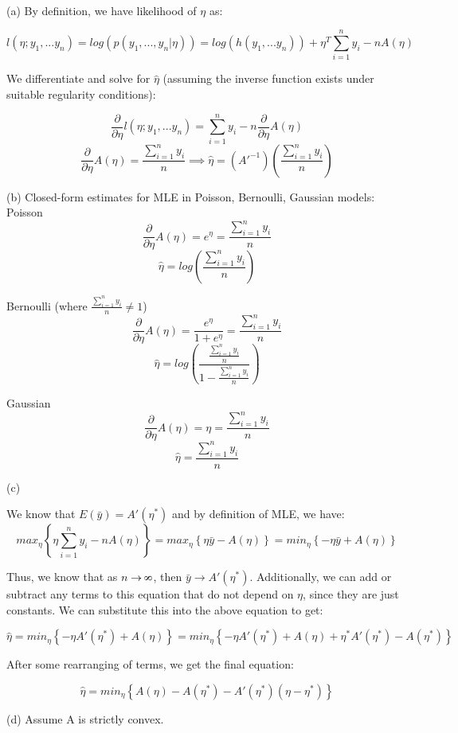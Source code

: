 \documentclass[11pt]{article}
\def\infinity{\rotatebox{90}{8}}
\newenvironment{problem}[2][Problem]{\begin{trivlist}
\item[\hskip \labelsep {\bfseries #1}\hskip \labelsep {\bfseries #2.}]}{\end{trivlist}}
\begin{document}
\begin{problem}{2.3}
\text{ }\\

(a) By definition, we have likelihood of $\eta$ as:

\[l(\eta; y_1,...y_n) = log(p(y_1,...,y_n|\eta)) = log(h(y_1,...y_n)) + \eta^T\sum^{n}_{i=1}y_i-nA(\eta)\]

\begin{adjustwidth}{2.5em}{0pt}
We differentiate and solve for $\hat{\eta}$ (assuming the inverse function exists under suitable regularity conditions):
\end{adjustwidth}

\[\frac{\partial}{\partial\eta}l(\eta; y_1,...y_n) = \sum^{n}_{i=1}y_i-n\frac{\partial}{\partial\eta}A(\eta)\]
\[\frac{\partial}{\partial\eta}A(\eta) = \frac{\sum^{n}_{i=1}y_i}{n} \implies \hat{\eta} = (A'^{-1})(\frac{\sum^{n}_{i=1}y_i}{n})\]

(b) Closed-form estimates for MLE in Poisson, Bernoulli, Gaussian models:
\\

Poisson
\[\frac{\partial}{\partial\eta}A(\eta) = e^{\eta} = \frac{\sum^{n}_{i=1}y_i}{n}\]
\[\hat{\eta} = log(\frac{\sum^{n}_{i=1}y_i}{n}) \]

Bernoulli (where $\frac{\sum^{n}_{i=1}y_i}{n} \neq 1$)
\[\frac{\partial}{\partial\eta}A(\eta) = \frac{e^{\eta}}{1+e^{\eta}} = \frac{\sum^{n}_{i=1}y_i}{n}\]
\[\hat{\eta} = log(\frac{\frac{\sum^{n}_{i=1}y_i}{n}}{1-\frac{\sum^{n}_{i=1}y_i}{n}})\]

Gaussian
\[\frac{\partial}{\partial\eta}A(\eta) = \eta = \frac{\sum^{n}_{i=1}y_i}{n} \]
\[\hat{\eta} = \frac{\sum^{n}_{i=1}y_i}{n}\]

(c)

We know that $E(\bar{y}) = A'(\eta^{*})$ and by definition of MLE, we have:
\[max_{\eta}\left\{{\eta\sum^{n}_{i=1}{y_i}-nA(\eta)}\right\} = max_{\eta}\left\{{\eta\bar{y}-A(\eta)}\right\} = min_{\eta}\left\{{-\eta\bar{y}+A(\eta)}\right\}\]

Thus, we know that as $n \rightarrow \infinity$, then $\bar{y} \rightarrow A'(\eta^{*})$. Additionally, we can add or subtract any terms to this equation that do not depend on $\eta$, since they are just constants. We can substitute this into the above equation to get:

\[\hat{\eta} = min_{\eta}\left\{{-\eta A'(\eta^{*})+A(\eta)}\right\} = min_{\eta}\left\{{-\eta A'(\eta^{*})+A(\eta) + \eta^{*}A'(\eta^{*}) - A(\eta^{*})}\right\}\]

After some rearranging of terms, we get the final equation:

\[\hat{\eta}= min_{\eta}\left\{ A(\eta) - A(\eta^{*}) - A'(\eta^{*})(\eta - \eta^{*})\right\} \]

{\color{red}(d) Assume A is strictly convex.} 

\end{problem}
\end{document}
